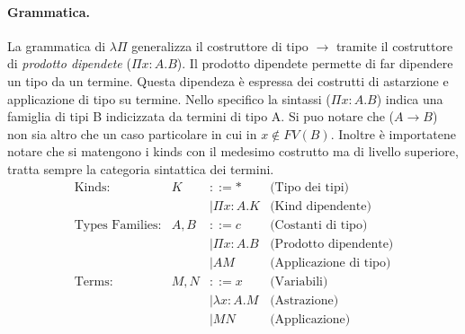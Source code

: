 \paragraph{Grammatica.}
La grammatica di $\lambda \Pi$ generalizza il costruttore di tipo $\to$ tramite il costruttore di \emph{prodotto dipendete} ($\Pi x : A.B$). Il prodotto dipendete permette di far dipendere un tipo
da un termine. Questa dipendeza è espressa dei costrutti di astarzione e applicazione di tipo su termine. Nello specifico la sintassi ($\Pi x : A.B$) indica una famiglia di tipi B indicizzata da
termini di tipo A. Si puo notare che ($A \to B$) non sia altro che un caso particolare in cui in $x \notin FV(B)$. Inoltre è importatene notare che si matengono i kinds con il medesimo costrutto
ma di livello superiore, tratta sempre la categoria sintattica dei termini.
\begin{equation}
    \begin{array}{lrll}
        \text{Kinds:}           & K           & ::= \ast                & \text{(Tipo dei tipi)}        \\
                                &             & \mid \Pi x : A. K       & \text{(Kind dipendente)}      \\
        \text{Types Families:}  & A, B        & ::= c                   & \text{(Costanti di tipo)}     \\
                                &             & \mid \Pi x : A. B       & \text{(Prodotto dipendente)}  \\
                                &             & \mid A M                & \text{(Applicazione di tipo)} \\
        \text{Terms:}           & M, N        & ::= x                   & \text{(Variabili)}            \\
                                &             & \mid \lambda x : A. M   & \text{(Astrazione)}           \\
                                &             & \mid M N                & \text{(Applicazione)}
    \end{array}
    \tag{$\lambda \Pi$}
    \label{eq:grammar_system_p}
\end{equation}

